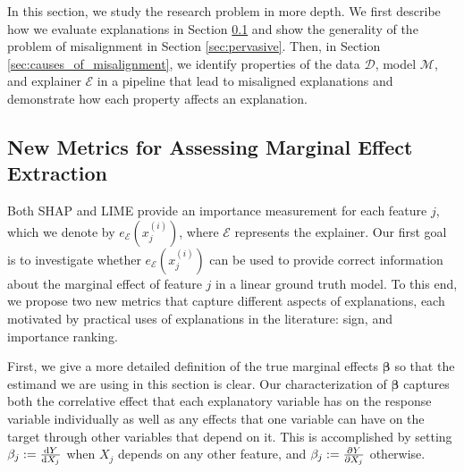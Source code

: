 \documentclass[mnsc,blindrev]{informs3}
\newcommand{\mD}{\mathcal{D}}
\newcommand{\mM}{\mathcal{M}}
\newcommand{\mE}{\mathcal{E}}
\begin{document}
  In this section, we study the research problem in more depth. We first describe how we evaluate explanations in Section \ref{sec:evaluating_faithfulness} and show the generality of the problem of misalignment in Section \ref{sec:pervasive}. 
  Then, in Section \ref{sec:causes_of_misalignment}, we identify properties of the data $\mD$, model $\mM$, and explainer $\mE$ in a pipeline that lead to misaligned explanations and demonstrate how each property affects an explanation.  %

\subsection{New Metrics for Assessing Marginal Effect Extraction}
   \label{sec:evaluating_faithfulness}
  Both SHAP and LIME provide an importance measurement for each feature $j$, which we denote by $e_\mE(x^{(i)}_j)$, where $\mE$ represents the explainer.
   Our first goal is to investigate whether $e_\mE(x^{(i)}_j)$ can be used to provide correct information about the marginal effect of feature $j$ in a linear ground truth model. To this end, we propose two new metrics that capture different aspects of explanations, each motivated by practical uses of explanations in the literature: sign, and importance ranking.%
     
     First, we give a more detailed definition of the true marginal effects $\boldsymbol{\beta}$ so that the estimand we are using in this section is clear. Our characterization of $\boldsymbol{\beta}$ captures both the correlative effect that each explanatory variable has on the response variable individually as well as any effects that one variable can have on the target through other variables that depend on it. This is accomplished by setting $\beta_j := \dv{Y}{X_j}$ when $X_j$ depends on any other feature, and $\beta_j := \pdv{Y}{X_j}$ otherwise. %
\end{document}
